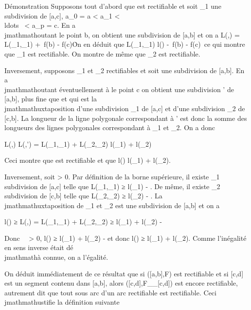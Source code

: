 \documentclass[]{article}
\begin{document}
Démonstration Supposons tout d'abord que \Gamma est rectifiable et soit
\sigma_1 une subdivision de {[}a,c{]}, a_0 = a \textless{}
a_1 \textless{}
\\ldots~ \textless{}
a_p = c. En a\\jmathmathoutant le point b, on obtient une subdivision \sigma
de {[}a,b{]} et on a L(\Gamma,\sigma) = L(\Gamma_1,\sigma_1)
+\ f(b) - f(c)\. On en
déduit que L(\Gamma_1,\sigma_1) \leq l(\Gamma)
-\ f(b) - f(c)\ ce qui
montre que \Gamma_1 est rectifiable. On montre de même que
\Gamma_2 est rectifiable.

Inversement, supposons \Gamma_1 et \Gamma_2 rectifiables et soit
\sigma une subdivision de {[}a,b{]}. En a\\jmathmathoutant éventuellement à \sigma le point
c on obtient une subdivision \sigma' de {[}a,b{]}, plus fine que \sigma et qui est
la \\jmathmathuxtaposition d'une subdivision \sigma_1 de {[}a,c{]} et d'une
subdivision \sigma_2 de {[}c,b{]}. La longueur de la ligne
polygonale correspondant à \sigma' est donc la somme des longueurs des lignes
polygonales correspondant à \sigma_1 et \sigma_2. On a donc

L(\Gamma,\sigma) \leq L(\Gamma,\sigma') = L(\Gamma_1,\sigma_1) +
L(\Gamma_2,\sigma_2) \leq l(\Gamma_1) + l(\Gamma_2)

Ceci montre que \Gamma est rectifiable et que l(\Gamma) \leq l(\Gamma_1) +
l(\Gamma_2).

Inversement, soit \epsilon \textgreater{} 0. Par définition de la borne
supérieure, il existe \sigma_1 subdivision de {[}a,c{]} telle que
L(\Gamma_1,\sigma_1) ≥ l(\Gamma_1) - \epsilon
{} . De même, il existe \sigma_2 subdivision
de {[}c,b{]} telle que L(\Gamma_2,\sigma_2) ≥ l(\Gamma_2)
- \epsilon {} . La \\jmathmathuxtaposition \sigma de \sigma_1 et
\sigma_2 est une subdivision de {[}a,b{]} et on a

l(\Gamma) ≥ L(\Gamma,\sigma) = L(\Gamma_1,\sigma_1) +
L(\Gamma_2,\sigma_2) ≥ l(\Gamma_1) + l(\Gamma_2) - \epsilon

Donc \forall~~\epsilon \textgreater{} 0, l(\Gamma) ≥
l(\Gamma_1) + l(\Gamma_2) - \epsilon et donc l(\Gamma) ≥ l(\Gamma_1) +
l(\Gamma_2). Comme l'inégalité en sens inverse était dé\\jmathmathà connue, on
a l'égalité.

On déduit immédiatement de ce résultat que si ({[}a,b{]},F) est
rectifiable et si {[}c,d{]} est un segment contenu dans {[}a,b{]}, alors
({[}c,d{]},F__{[}c,d{]}) est encore
rectifiable, autrement dit que tout sous arc d'un arc rectifiable est
rectifiable. Ceci \\jmathmathustifie la définition suivante
\end{document}
